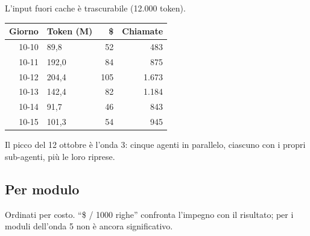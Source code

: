\documentclass[11pt]{article}
\begin{document}
L'input fuori cache è trascurabile (12.000 token).

\begin{center}
\begin{tabular}{rlrr}
Giorno & Token (M) & \$ & Chiamate\\
\hline
10-10 & 89,8 & 52 & 483\\
10-11 & 192,0 & 84 & 875\\
10-12 & 204,4 & 105 & 1.673\\
10-13 & 142,4 & 82 & 1.184\\
10-14 & 91,7 & 46 & 843\\
10-15 & 101,3 & 54 & 945\\
\end{tabular}
\end{center}

Il picco del 12 ottobre è l'onda 3: cinque agenti in parallelo, ciascuno con i propri sub-agenti, più le loro
riprese.
\subsection{Per modulo}
\label{sec:org8766aed}
Ordinati per costo. ``\$ / 1000 righe'' confronta l'impegno con il risultato; per i moduli dell'onda 5 non è ancora
significativo.
\end{document}
